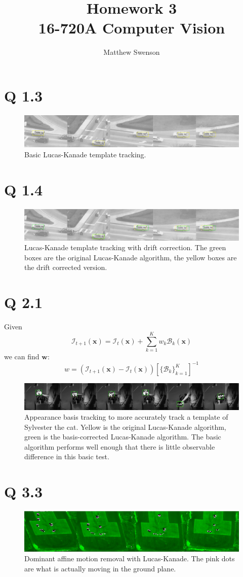 \documentclass[11pt]{article}
\title{Homework 3\\ \vspace{2mm}\Large{16-720A Computer Vision }}
\author{Matthew Swenson}
\begin{document}
	\maketitle
	
\section*{Q 1.3}
\begin{figure}[H]
\centering
\includegraphics[width=\textwidth]{cartest.png}
\caption{Basic Lucas-Kanade template tracking.}
\end{figure}
\section*{Q 1.4}
\begin{figure}[H]
\centering
\includegraphics[width=\textwidth]{cartestcorrected.png}
\caption{Lucas-Kanade template tracking with drift correction. The green boxes are the original Lucas-Kanade
algorithm, the yellow boxes are the drift corrected version.}
\end{figure}
\section*{Q 2.1}
Given
$$
\mathcal{I}_{t+1}(\mathbf{x}) =\mathcal{I}_t(\mathbf{x}) +\sum_{k=1}^{K} w_k\mathcal{B}_{k
}(\mathbf{x}) 
$$
we can find $\mathbf{w}$:
$$
    w = \left(\mathcal{I}_{t+1}(\mathbf{x}) - \mathcal{I}_t(\mathbf{x}) \right) \left[\{\mathcal{B}_k\}_{k=1}^K\right]^{-1}
$$
\begin{figure}[H]
\centering
\includegraphics[width=\textwidth]{sylvtest.png}
\caption{Appearance basis tracking to more accurately track a template of Sylvester the cat. Yellow is the original Lucas-Kanade algorithm, 
        green is the basis-corrected Lucas-Kanade algorithm. The basic algorithm performs well enough that there is little observable difference
    in this basic test.}
\end{figure}

\section*{Q 3.3}
\begin{figure}[H]
\centering
\includegraphics[width=\textwidth]{aerialtest.png}
\caption{Dominant affine motion removal with Lucas-Kanade. The pink dots are what is actually moving in the ground plane.}
\end{figure}
\end{document}
